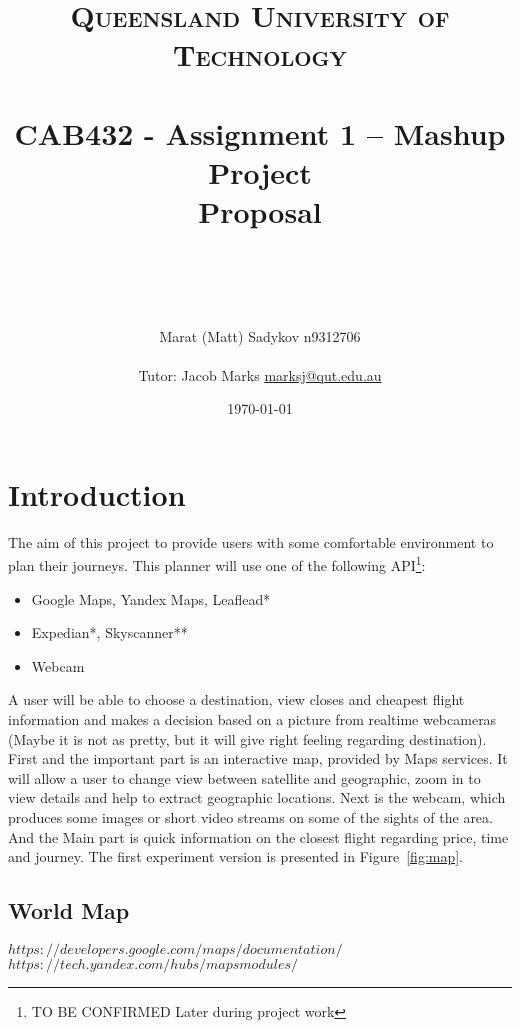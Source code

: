 \documentclass[12pt]{article}
\title{	
	\normalfont \normalsize 
	\textsc{Queensland University of Technology} \\ [25pt] 
	\horrule{0.5pt} \\[0.4cm] %
	\huge CAB432 - Assignment 1 – Mashup Project \\ Proposal \\ %
	\author{ Marat (Matt) Sadykov \small n9312706 \\ \\ Tutor: Jacob Marks \small \underline{marksj@qut.edu.au}}
	\date{\normalsize\today} %
	\horrule{2pt} \\[0.5cm] %
}
\numberwithin{equation}{section} %
\numberwithin{figure}{section} %
\numberwithin{table}{section} %
\begin{document}
\maketitle
\newpage
\newpage
\section{Introduction}	

	The aim of this project to provide users with some comfortable environment to plan their journeys. This planner will use one of the following API\footnote{TO BE CONFIRMED Later during project work}: 
	
	\begin{itemize}
		\item Google Maps, Yandex Maps, Leaflead*
		\item Expedian*, Skyscanner**
		\item Webcam
	\end{itemize}
	
	A user will be able to choose a destination, view closes and cheapest flight information and makes a decision based on a picture from realtime webcameras (Maybe it is not as pretty, but it will give right feeling regarding destination). First and the important part is an interactive map, provided by Maps services. It will allow a user to change view between satellite and geographic, zoom in to view details and help to extract geographic locations. Next is the webcam, which produces some images or short video streams on some of the sights of the area. And the Main part is quick information on the closest flight regarding price, time and journey. The first experiment version is presented in Figure~\ref{fig:map}.
	

	

	\subsection{World Map}
		$ https://developers.google.com/maps/documentation/ $ \\
		$ https://tech.yandex.com/hubs/mapsmodules/ $ \\
		
\end{document}
